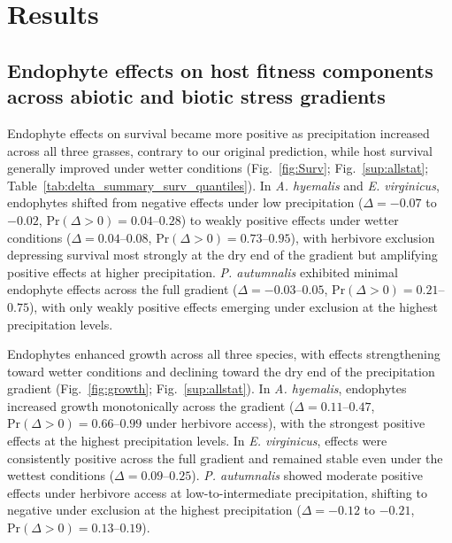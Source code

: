 \documentclass[12pt]{article}\usepackage[]{graphicx}\usepackage[dvipsnames]{xcolor}
\begin{document}
\section*{Results}
\subsection*{Endophyte effects on host fitness components across abiotic and biotic stress gradients}

Endophyte effects on survival became more positive as precipitation increased across all three grasses, contrary to our original prediction, while host survival generally improved under wetter conditions (Fig.~\ref{fig:Surv}; Fig.~\ref{sup:allstat}; Table~\ref{tab:delta_summary_surv_quantiles}).
In \textit{A. hyemalis} and \textit{E. virginicus}, endophytes shifted from negative effects under low precipitation ($\Delta = -0.07$ to $-0.02$, $\mathrm{Pr}(\Delta>0) = 0.04$--$0.28$) to weakly positive effects under wetter conditions ($\Delta = 0.04$--$0.08$, $\mathrm{Pr}(\Delta>0) = 0.73$--$0.95$), with herbivore exclusion depressing survival most strongly at the dry end of the gradient but amplifying positive effects at higher precipitation.
\textit{P. autumnalis} exhibited minimal endophyte effects across the full gradient ($\Delta = -0.03$--$0.05$, $\mathrm{Pr}(\Delta>0) = 0.21$--$0.75$), with only weakly positive effects emerging under exclusion at the highest precipitation levels.

Endophytes enhanced growth across all three species, with effects strengthening toward wetter conditions and declining toward the dry end of the precipitation gradient (Fig.~\ref{fig:growth}; Fig.~\ref{sup:allstat}).
In \textit{A. hyemalis}, endophytes increased growth monotonically across the gradient ($\Delta = 0.11$--$0.47$, $\mathrm{Pr}(\Delta>0) = 0.66$--$0.99$ under herbivore access), with the strongest positive effects at the highest precipitation levels.
In \textit{E. virginicus}, effects were consistently positive across the full gradient and remained stable even under the wettest conditions ($\Delta = 0.09$--$0.25$).
\textit{P. autumnalis} showed moderate positive effects under herbivore access at low-to-intermediate precipitation, shifting to negative under exclusion at the highest precipitation ($\Delta = -0.12$ to $-0.21$, $\mathrm{Pr}(\Delta>0) = 0.13$--$0.19$).
\end{document}
